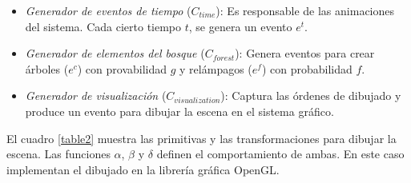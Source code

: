 \documentclass[runningheads]{llncs}
\begin{document}
\begin{itemize}
	\item \textit{Generador de eventos de tiempo} ($C_{time}$): Es responsable de las animaciones del sistema. Cada cierto tiempo $t$, se genera un evento $e^t$.

	\item \textit{Generador de elementos del bosque} ($C_{forest}$): Genera eventos para crear \'arboles ($e^{c}$) con provabilidad $g$ y rel\'ampagos ($e^{f}$) con probabilidad $f$.

	\item \textit{Generador de visualizaci\'on} ($C_{visualization}$): Captura las \'ordenes de dibujado y produce un evento para dibujar la escena en el sistema gr\'afico.
\end{itemize}

El cuadro \ref{table2} muestra las primitivas y las transformaciones para dibujar la escena. Las funciones 
${\alpha}$, ${\beta}$ y ${\delta}$ definen el comportamiento de ambas. En este caso implementan el dibujado en la librer\'ia gr\'afica OpenGL.
\end{document}
